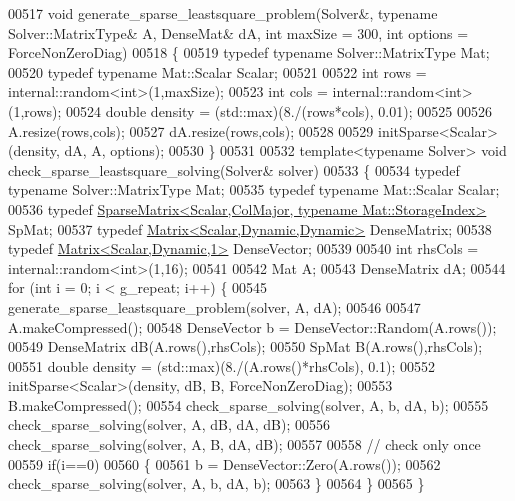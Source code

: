 \begin{DoxyCode}
00517 \textcolor{keywordtype}{void} generate\_sparse\_leastsquare\_problem(Solver&, \textcolor{keyword}{typename} Solver::MatrixType& A, DenseMat& dA, \textcolor{keywordtype}{int} maxSize
       = 300, \textcolor{keywordtype}{int} options = ForceNonZeroDiag)
00518 \{
00519   \textcolor{keyword}{typedef} \textcolor{keyword}{typename} Solver::MatrixType Mat;
00520   \textcolor{keyword}{typedef} \textcolor{keyword}{typename} Mat::Scalar Scalar;
00521 
00522   \textcolor{keywordtype}{int} rows = internal::random<int>(1,maxSize);
00523   \textcolor{keywordtype}{int} cols = internal::random<int>(1,rows);
00524   \textcolor{keywordtype}{double} density = (std::max)(8./(rows*cols), 0.01);
00525   
00526   A.resize(rows,cols);
00527   dA.resize(rows,cols);
00528 
00529   initSparse<Scalar>(density, dA, A, options);
00530 \}
00531 
00532 \textcolor{keyword}{template}<\textcolor{keyword}{typename} Solver> \textcolor{keywordtype}{void} check\_sparse\_leastsquare\_solving(Solver& solver)
00533 \{
00534   \textcolor{keyword}{typedef} \textcolor{keyword}{typename} Solver::MatrixType Mat;
00535   \textcolor{keyword}{typedef} \textcolor{keyword}{typename} Mat::Scalar Scalar;
00536   \textcolor{keyword}{typedef} \hyperlink{group___sparse_core___module_class_eigen_1_1_sparse_matrix}{SparseMatrix<Scalar,ColMajor, typename Mat::StorageIndex>}
       SpMat;
00537   \textcolor{keyword}{typedef} \hyperlink{group___core___module}{Matrix<Scalar,Dynamic,Dynamic>} DenseMatrix;
00538   \textcolor{keyword}{typedef} \hyperlink{group___core___module}{Matrix<Scalar,Dynamic,1>} DenseVector;
00539 
00540   \textcolor{keywordtype}{int} rhsCols = internal::random<int>(1,16);
00541 
00542   Mat A;
00543   DenseMatrix dA;
00544   \textcolor{keywordflow}{for} (\textcolor{keywordtype}{int} i = 0; i < g\_repeat; i++) \{
00545     generate\_sparse\_leastsquare\_problem(solver, A, dA);
00546 
00547     A.makeCompressed();
00548     DenseVector b = DenseVector::Random(A.rows());
00549     DenseMatrix dB(A.rows(),rhsCols);
00550     SpMat B(A.rows(),rhsCols);
00551     \textcolor{keywordtype}{double} density = (std::max)(8./(A.rows()*rhsCols), 0.1);
00552     initSparse<Scalar>(density, dB, B, ForceNonZeroDiag);
00553     B.makeCompressed();
00554     check\_sparse\_solving(solver, A, b,  dA, b);
00555     check\_sparse\_solving(solver, A, dB, dA, dB);
00556     check\_sparse\_solving(solver, A, B,  dA, dB);
00557     
00558     \textcolor{comment}{// check only once}
00559     \textcolor{keywordflow}{if}(i==0)
00560     \{
00561       b = DenseVector::Zero(A.rows());
00562       check\_sparse\_solving(solver, A, b, dA, b);
00563     \}
00564   \}
00565 \}
\end{DoxyCode}
